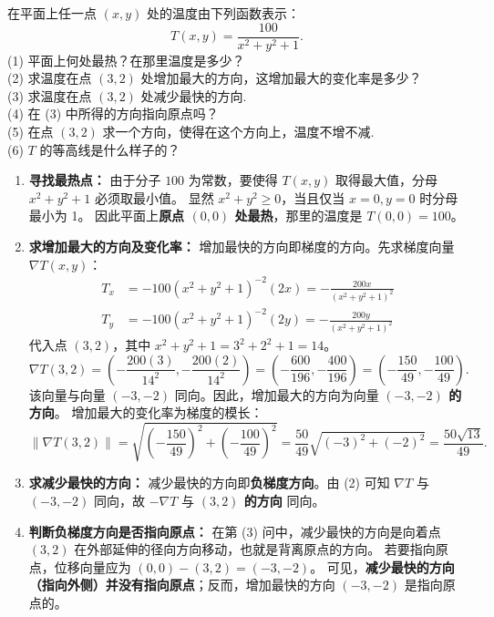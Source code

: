 \documentclass[lang=cn,11pt]{elegantbook}
\begin{document}
\begin{exercise}[梯度的几何与物理综合应用]
在平面上任一点 $(x,y)$ 处的温度由下列函数表示：
\[
T(x,y)=\frac{100}{x^2+y^2+1}.
\]
(1) 平面上何处最热？在那里温度是多少？\\
(2) 求温度在点 $(3,2)$ 处增加最大的方向，这增加最大的变化率是多少？\\
(3) 求温度在点 $(3,2)$ 处减少最快的方向.\\
(4) 在 (3) 中所得的方向指向原点吗？\\
(5) 在点 $(3,2)$ 求一个方向，使得在这个方向上，温度不增不减.\\
(6) $T$ 的等高线是什么样子的？\\
\end{exercise}
\begin{solution}
\begin{enumerate}
  \item[(1)] \textbf{寻找最热点：}
  由于分子 $100$ 为常数，要使得 $T(x,y)$ 取得最大值，分母 $x^2+y^2+1$ 必须取最小值。
  显然 $x^2+y^2 \geq 0$，当且仅当 $x=0, y=0$ 时分母最小为 1。
  因此平面上\textbf{原点 $(0,0)$ 处最热}，那里的温度是 $T(0,0) = 100$。

  \item[(2)] \textbf{求增加最大的方向及变化率：}
  增加最快的方向即梯度的方向。先求梯度向量 $\nabla T(x,y)$：
  \begin{align*}
  T_x &= -100(x^2+y^2+1)^{-2}(2x) = -\frac{200x}{(x^2+y^2+1)^2} \\
  T_y &= -100(x^2+y^2+1)^{-2}(2y) = -\frac{200y}{(x^2+y^2+1)^2}
  \end{align*}
  代入点 $(3,2)$，其中 $x^2+y^2+1 = 3^2+2^2+1 = 14$。
  \[
  \nabla T(3,2) = \left( -\frac{200(3)}{14^2}, -\frac{200(2)}{14^2} \right) = \left(-\frac{600}{196}, -\frac{400}{196}\right) = \left(-\frac{150}{49}, -\frac{100}{49}\right).
  \]
  该向量与向量 $(-3, -2)$ 同向。因此，增加最大的方向为向量 \textbf{$(-3,-2)$ 的方向}。
  增加最大的变化率为梯度的模长：
  \[
  \|\nabla T(3,2)\| = \sqrt{\left(-\frac{150}{49}\right)^2 + \left(-\frac{100}{49}\right)^2} = \frac{50}{49}\sqrt{(-3)^2+(-2)^2} = \frac{50\sqrt{13}}{49}.
  \]

  \item[(3)] \textbf{求减少最快的方向：}
  减少最快的方向即\textbf{负梯度方向}。由 (2) 可知 $\nabla T$ 与 $(-3,-2)$ 同向，故 $-\nabla T$ 与 \textbf{$(3,2)$ 的方向} 同向。

  \item[(4)] \textbf{判断负梯度方向是否指向原点：}
  在第 (3) 问中，减少最快的方向是向着点 $(3,2)$ 在外部延伸的径向方向移动，也就是背离原点的方向。
  若要指向原点，位移向量应为 $(0,0) - (3,2) = (-3,-2)$。
  可见，\textbf{减少最快的方向（指向外侧）并没有指向原点}；反而，增加最快的方向 $(-3,-2)$ 是指向原点的。


\end{enumerate}
\end{solution}
\end{document}
